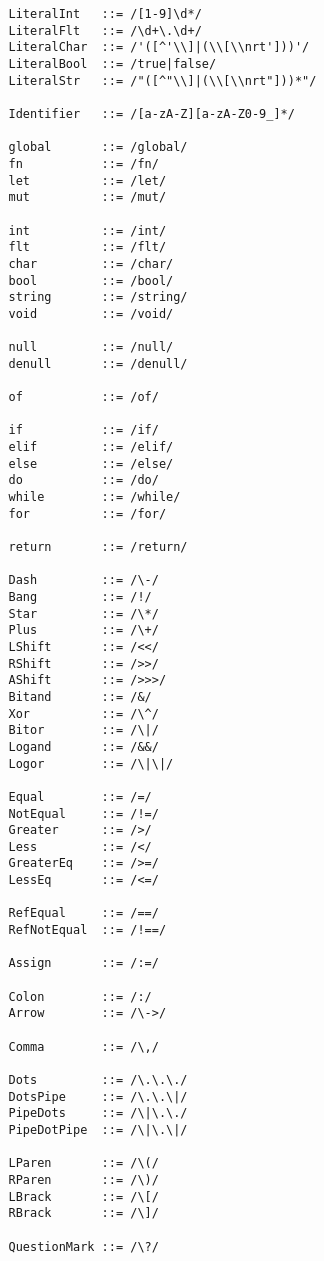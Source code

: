\documentclass{article}
\begin{document}
			\begin{verbatim}
				LiteralInt   ::= /[1-9]\d*/
				LiteralFlt   ::= /\d+\.\d+/
				LiteralChar  ::= /'([^'\\]|(\\[\\nrt']))'/
				LiteralBool  ::= /true|false/
				LiteralStr   ::= /"([^"\\]|(\\[\\nrt"]))*"/
				
				Identifier   ::= /[a-zA-Z][a-zA-Z0-9_]*/
				
				global       ::= /global/
				fn           ::= /fn/
				let          ::= /let/
				mut          ::= /mut/
				
				int          ::= /int/
				flt          ::= /flt/
				char         ::= /char/
				bool         ::= /bool/
				string       ::= /string/
				void         ::= /void/
				
				null         ::= /null/
				denull       ::= /denull/
				
				of           ::= /of/
				
				if           ::= /if/
				elif         ::= /elif/
				else         ::= /else/
				do           ::= /do/
				while        ::= /while/
				for          ::= /for/
				 
				return       ::= /return/
				
				Dash         ::= /\-/
				Bang         ::= /!/
				Star         ::= /\*/
				Plus         ::= /\+/
				LShift       ::= /<</
				RShift       ::= />>/
				AShift       ::= />>>/
				Bitand       ::= /&/
				Xor          ::= /\^/
				Bitor        ::= /\|/
				Logand       ::= /&&/
				Logor        ::= /\|\|/
				
				Equal        ::= /=/
				NotEqual     ::= /!=/
				Greater      ::= />/
				Less         ::= /</
				GreaterEq    ::= />=/
				LessEq       ::= /<=/
				
				RefEqual     ::= /==/
				RefNotEqual  ::= /!==/
				
				Assign       ::= /:=/
				
				Colon        ::= /:/
				Arrow        ::= /\->/
				
				Comma        ::= /\,/
				
				Dots         ::= /\.\.\./
				DotsPipe     ::= /\.\.\|/
				PipeDots     ::= /\|\.\./
				PipeDotPipe  ::= /\|\.\|/
				
				LParen       ::= /\(/
				RParen       ::= /\)/
				LBrack       ::= /\[/
				RBrack       ::= /\]/
				
				QuestionMark ::= /\?/
			\end{verbatim}
			
\end{document}
